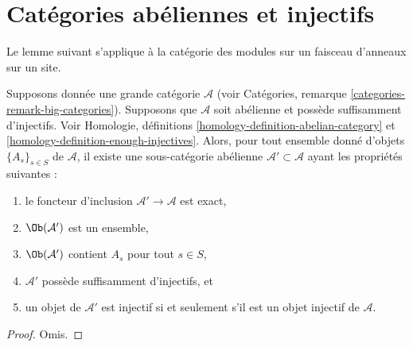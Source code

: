 \section{Catégories abéliennes et injectifs}
\label{section-abelian-categories-injectives}

\noindent
Le lemme suivant s'applique à la catégorie des modules sur un faisceau
d'anneaux sur un site.

\begin{lemma}
\label{lemma-abelian-injectives}
Supposons donnée une grande catégorie $\mathcal{A}$ (voir Catégories,
remarque \ref{categories-remark-big-categories}).
Supposons que $\mathcal{A}$ soit abélienne et possède suffisamment d'injectifs.
Voir Homologie, définitions \ref{homology-definition-abelian-category}
et \ref{homology-definition-enough-injectives}.
Alors, pour tout ensemble donné d'objets $\{A_s\}_{s\in S}$ de
$\mathcal{A}$, il existe une sous-catégorie abélienne
$\mathcal{A}' \subset \mathcal{A}$ ayant les propriétés suivantes :
\begin{enumerate}
\item le foncteur d'inclusion $\mathcal{A}' \to \mathcal{A}$ est exact,
\item $\Ob(\mathcal{A}')$ est un ensemble,
\item $\Ob(\mathcal{A}')$ contient $A_s$ pour tout $s \in S$,
\item $\mathcal{A}'$ possède suffisamment d'injectifs, et
\item un objet de $\mathcal{A}'$ est injectif si et seulement s'il est un
objet injectif de $\mathcal{A}$.
\end{enumerate}
\end{lemma}

\begin{proof}
Omis.
\end{proof}















